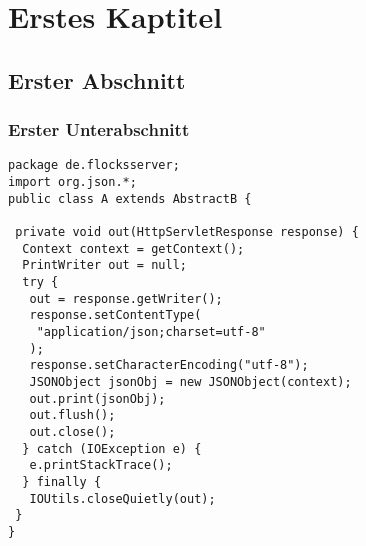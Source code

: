 \chapter{Erstes Kaptitel}
\blindtext
\section{Erster Abschnitt}
\blindtext
\blinddescription
\subsection{Erster Unterabschnitt}
\begin{lstlisting}[label=Codebeispiel1,caption=Mein Codebeispiel in Latex]
package de.flocksserver;
import org.json.*;
public class A extends AbstractB {

 private void out(HttpServletResponse response) {
  Context context = getContext();
  PrintWriter out = null;
  try {
   out = response.getWriter();
   response.setContentType(
	"application/json;charset=utf-8"
   );
   response.setCharacterEncoding("utf-8");
   JSONObject jsonObj = new JSONObject(context);
   out.print(jsonObj);
   out.flush();
   out.close();
  } catch (IOException e) {
   e.printStackTrace();
  } finally {
   IOUtils.closeQuietly(out);
 }
}
\end{lstlisting}
